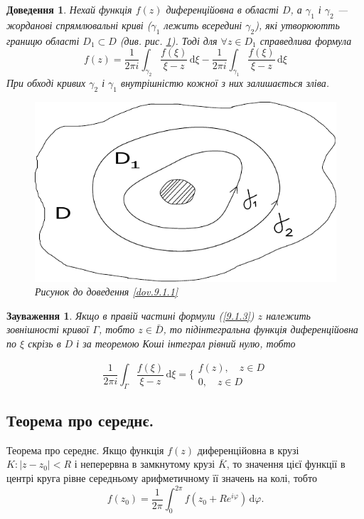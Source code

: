 \documentclass[12pt,fleqn]{article}
\theoremstyle{theorem}
\theoremstyle{proof}
\newtheorem*{dov}{Доведення}
\newtheorem{remark}{Зауваження}[section]
\numberwithin{figure}{section}
\numberwithin{equation}{section}
\begin{document}
\begin{dov}
Нехай функція $f(z)$ диференційовна в області $D$, а $\gamma_1$ і $\gamma_2$ --- жорданові спрямлювальні криві ($\gamma_1$ лежить всередині $\gamma_2$), які утворюютть границю області $D_1 \subset D$ (див. рис. \ref{fig.9.1.1}). Тоді для $\forall z \in D_1$ справедлива формула
\begin{equation}\label{9.1.4}
f(z)=\frac{1}{2\pi i}\int_{\gamma_2}\frac{f(\xi)}{\xi-z}\,\mathrm{d}\xi-\frac{1}{2\pi i}\int_{\gamma_1}\frac{f(\xi)}{\xi-z}\,\mathrm{d}\xi
\end{equation}
При обході кривих $\gamma_2$ і $\gamma_1$ внутрішністю кожної з них залишається зліва.
\begin{figure}
  \centering
  \includegraphics{fig4}
  \caption{Рисунок до доведення \ref{dov.9.1.1}}\label{fig.9.1.1}
\end{figure}
\end{dov}


\begin{remark}\label{remark_9.1.1}
Якщо в правій частині формули (\ref{9.1.3}) $z$ належить зовнішності кривої $\Gamma$, тобто $z \in \bar{D}$, то підінтегральна функція диференційовна по $\xi$ скрізь в $D$ і за теоремою Коші інтеграл рівний нулю, тобто

\[ \frac{1}{2\pi i} \int_{\Gamma} \frac{f(\xi)}{\xi-z}\,\mathrm{d}\xi= \bigg\{ \begin{matrix} f(z), \quad z\in D \\ 0, \quad z \in D \end{matrix} \]

\end{remark}

\subsection{Теорема про середнє.}\label{9.2}
Теорема про середнє. Якщо функція $f(z)$ диференційовна в крузі $K:|z-z_0|<R$ і неперервна в замкнутому крузі $\bar{K}$, то значення цієї функції в центрі круга рівне середньому арифметичному її значень на колі, тобто
\begin{equation}\label{9.2.1}
f(z_0)=\frac{1}{2\pi}\int_{0}^{2\pi}f(z_0+Re^{i\varphi})\,\mathrm{d}\varphi.
\end{equation}
\end{document}
